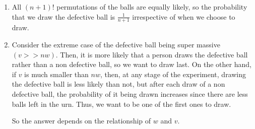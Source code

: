 \begin{enumerate}[label=(\alph*)]
\item All $(n+1)!$ permutations of the balls are equally likely, so the
probability that we draw the defective ball is $\frac{1}{n+1}$ irrespective of
when we choose to draw.

\item Consider the extreme case of the defective ball being super massive 
$(v >> nw)$. Then, it is more likely that a person draws the defective ball
rather than a non defective ball, so we want to draw last. On the other hand, 
if $v$ is much smaller than $nw$, then, at any stage of the experiment, 
drawing the defective ball is less likely than not, but after each draw of a 
non defective ball, the probability of it being drawn increases since there are
less balls left in the urn. Thus, we want to be one of the first ones to draw.

So the answer depends on the relationship of $w$ and $v$.

\end{enumerate}